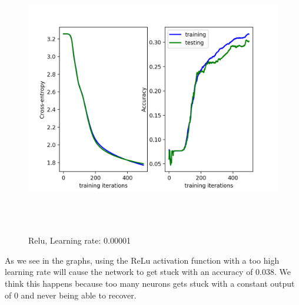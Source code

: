 \documentclass[a4paper]{article}
\begin{document}
\begin{figure}[h]
\caption{Relu, Learning rate: 0.00001}
\centering
\includegraphics[width=15cm, height=12cm]{LR00001_3.png}
\end{figure}


As we see in the graphs, using the ReLu activation function with a too high learning rate will cause the network to get stuck with an accuracy of 0.038. We think this happens because too many neurons gets stuck with a constant output of 0 and never being able to recover.
\end{document}

